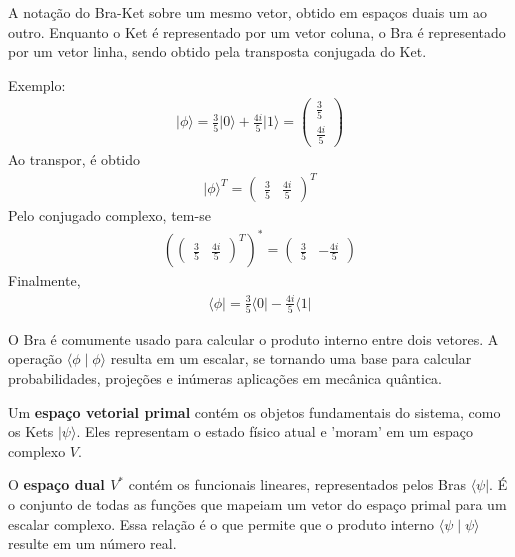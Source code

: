 \documentclass[12pt, a4paper]{article}
\newcommand{\ket}[1]{\lvert #1 \rangle}
\newcommand{\bra}[1]{\langle #1 \rvert}
\newcommand{\braket}[2]{\langle #1 \mid #2 \rangle}
\begin{document}
A notação do Bra-Ket sobre um mesmo vetor, obtido em espaços duais um ao outro. Enquanto o Ket é representado por um vetor coluna, o Bra é representado por um vetor linha, sendo obtido pela transposta conjugada do Ket. 


Exemplo:\[
    \begin{aligned}
        \ket{\phi} = 
        \frac{3}{5}\ket{0} + \frac{4i}{5}\ket{1} = 
        \begin{pmatrix}
            \frac{3}{5} \\[1ex]
            \frac{4i}{5}
        \end{pmatrix}
    \end{aligned}
\]
Ao transpor, é obtido \[
    \begin{aligned}
        \ket{\phi}^T = 
        \begin{pmatrix}
            \frac{3}{5} & \frac{4i}{5}
        \end{pmatrix}^T
    \end{aligned}
\]
Pelo conjugado complexo, tem-se \[
    \begin{aligned}
        (\begin{pmatrix}
            \frac{3}{5} & \frac{4i}{5}
        \end{pmatrix}^T)^*
        = 
        \begin{pmatrix}
            \frac{3}{5} & -\frac{4i}{5}
        \end{pmatrix}
    \end{aligned}
\]
Finalmente, \[
    \begin{aligned}
        \bra{\phi} = \frac{3}{5}\bra{0} - \frac{4i}{5}\bra{1}
    \end{aligned}
\]

O Bra é comumente usado para calcular o produto interno entre dois vetores. A operação \(\braket{\phi}{\phi}\) resulta em um escalar, se tornando uma base para calcular probabilidades, projeções e inúmeras aplicações em mecânica quântica.

Um \textbf{espaço vetorial primal} contém os objetos fundamentais do sistema, como os Kets $\ket{\psi}$. Eles representam o estado físico atual e 'moram' em um espaço complexo $V$.

O \textbf{espaço dual $V^*$} contém os funcionais lineares, representados pelos Bras $\bra{\psi}$. É o conjunto de todas as funções que mapeiam um vetor do espaço primal para um escalar complexo. Essa relação é o que permite que o produto interno $\braket{\psi}{\psi}$ resulte em um número real.
\end{document}
